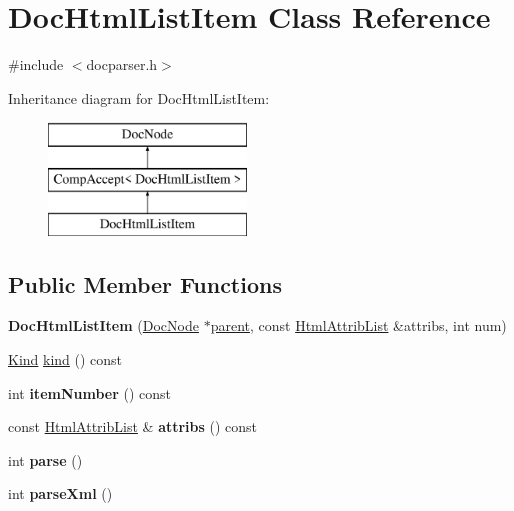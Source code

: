 \hypertarget{class_doc_html_list_item}{}\section{Doc\+Html\+List\+Item Class Reference}
\label{class_doc_html_list_item}


{\ttfamily \#include $<$docparser.\+h$>$}

Inheritance diagram for Doc\+Html\+List\+Item\+:\begin{figure}[H]
\begin{center}
\leavevmode
\includegraphics[height=3.000000cm]{class_doc_html_list_item}
\end{center}
\end{figure}
\subsection*{Public Member Functions}
\begin{DoxyCompactItemize}
\item 
\mbox{\label{class_doc_html_list_item_ae73e56511ea1e13dc4ecb240a2291bb8}} 
{\bfseries Doc\+Html\+List\+Item} (\mbox{\hyperlink{class_doc_node}{Doc\+Node}} $\ast$\mbox{\hyperlink{class_doc_node_a73e8ad29a91cfceb0968eb00db71a23d}{parent}}, const \mbox{\hyperlink{class_html_attrib_list}{Html\+Attrib\+List}} \&attribs, int num)
\item 
\mbox{\hyperlink{class_doc_node_aebd16e89ca590d84cbd40543ea5faadb}{Kind}} \mbox{\hyperlink{class_doc_html_list_item_ae4c720be5343803f1a30c2cd871a7861}{kind}} () const
\item 
\mbox{\label{class_doc_html_list_item_a77ed4fb99b1f5f1eb0099cb15bbcabec}} 
int {\bfseries item\+Number} () const
\item 
\mbox{\label{class_doc_html_list_item_ad3a644bafba741674af0f0c918dece51}} 
const \mbox{\hyperlink{class_html_attrib_list}{Html\+Attrib\+List}} \& {\bfseries attribs} () const
\item 
\mbox{\label{class_doc_html_list_item_a950e04796a8834be581d76e7e1bd2c77}} 
int {\bfseries parse} ()
\item 
\mbox{\label{class_doc_html_list_item_a4757869d31645ffa5ad52ed2c66fa943}} 
int {\bfseries parse\+Xml} ()
\end{DoxyCompactItemize}
